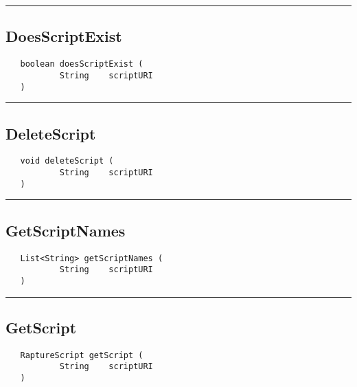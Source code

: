 \rule{15cm}{2pt}
\subsection{DoesScriptExist}
\label{Api:DoesScriptExist}
\begin{verbatim}
   boolean doesScriptExist (
           String    scriptURI
   )
\end{verbatim}



\rule{15cm}{2pt}
\subsection{DeleteScript}
\label{Api:DeleteScript}
\begin{verbatim}
   void deleteScript (
           String    scriptURI
   )
\end{verbatim}



\rule{15cm}{2pt}
\subsection{GetScriptNames}
\label{Api:GetScriptNames}
\begin{verbatim}
   List<String> getScriptNames (
           String    scriptURI
   )
\end{verbatim}



\rule{15cm}{2pt}
\subsection{GetScript}
\label{Api:GetScript}
\begin{verbatim}
   RaptureScript getScript (
           String    scriptURI
   )
\end{verbatim}



